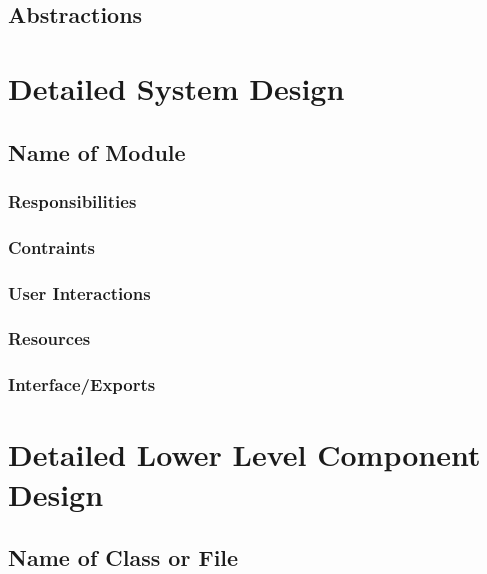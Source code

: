 \documentclass[11pt]{article}
\begin{document}
\subsection{Abstractions}
\label{sec:abstractions}

\newpage %
\section{Detailed System Design}
\label{sec:detailed}

\subsection{Name of Module}
\label{sec:module}

\subsubsection{Responsibilities}
\label{sec:responsibilities}

\subsubsection{Contraints}
\label{sec:constraints}

\subsubsection{User Interactions}
\label{sec:interactions}

\subsubsection{Resources}
\label{sec:resources}

\subsubsection{Interface/Exports}
\label{sec:exports}

\section{Detailed Lower Level Component Design}
\label{sec:lower}

\subsection{Name of Class or File}
\label{sec:class}
\end{document}
